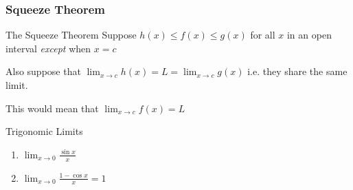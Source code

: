 \documentclass{MathNotes}
\begin{document}
\newpage
\subsubsection{Squeeze Theorem}\label{sec:1.3.2}

\begin{multicols}{2}[]
    \begin{theorem}{The Squeeze Theorem}
        Suppose $h(x)\leq f(x) \leq g(x)$ for all $x$ in an open interval
        \textit{except} when $x=c$
        \br

        Also suppose that $\lim_{x\to c}h(x)=L=\lim_{x\to c}g(x)$ i.e. they share
        the same limit.
        \br

        This would mean that $\lim_{x\to c}f(x)=L$
    \end{theorem}

    \begin{theorem}{Trigonomic Limits}
        \begin{enumerate}
            \item $\lim_{x\to 0}\frac{\sin x}{x}$
            \item $\lim_{x\to 0}\frac{1 - \cos x}{x} = 1$
        \end{enumerate}
    \end{theorem}

    \begin{center}
\end{center}
\end{multicols}
\end{document}
